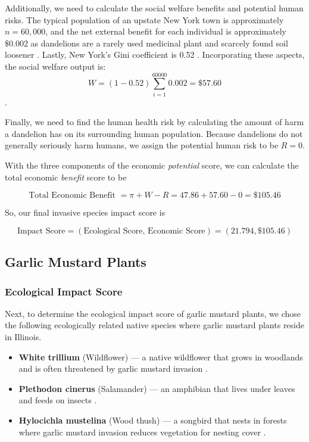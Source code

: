 Additionally, we need to calculate the social welfare benefits and potential human risks. The typical population of an upstate New York town is approximately \(n = 60,000\), and the net external benefit for each individual is approximately \(\$0.002\) as dandelions are a rarely used medicinal plant and scarcely found soil loosener \cite{healthlineDandelionHealth}. Lastly, New York's Gini coefficient is 0.52 \cite{statistaBetweenRich}. Incorporating these aspects, the social welfare output is: \[W = (1- 0.52) \sum_{i = 1}^{60000} 0.002 = \$57.60\].

Finally, we need to find the human health risk by calculating the amount of harm a dandelion has on its surrounding human population. Because dandelions do not generally seriously harm humans, we assign the potential human risk to be \(R = 0\).

With the three components of the economic \textit{potential} score, we can calculate the total economic \textit{benefit} score to be 

\[\text{Total Economic Benefit } = \pi + W - R = 47.86 + 57.60 - 0 = \$105.46\]

So, our final invasive species impact score is

\[\text{Impact Score} = (\text{Ecological Score, Economic Score}) = (21.794, \$105.46)\]

\subsection{Garlic Mustard Plants}

\subsubsection{Ecological Impact Score}

Next, to determine the ecological impact score of garlic mustard plants, we chose the following ecologically related native species where garlic mustard plants reside in Illinois.

\begin{itemize}
    \item \textbf{White trillium} (Wildflower) — a native wildflower that grows in woodlands and is often threatened by garlic mustard invasion \cite{usdaGreatWhite}.
    \item \textbf{Plethodon cinerus} (Salamander) — an amphibian that lives under leaves and feeds on insects \cite{amphibiawebAmphibiaWebPlethodon}.
    \item \textbf{Hylocichla mustelina} (Wood thush) — a songbird that nests in forests where garlic mustard invasion reduces vegetation for nesting cover \cite{allaboutbirdsWoodThrush}.
\end{itemize}

